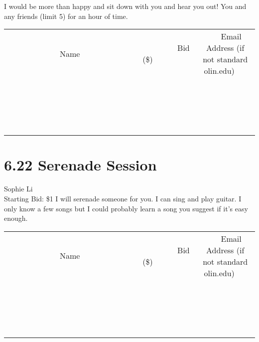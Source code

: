 \documentclass[11pt]{article}
\begin{document}
I would be more than happy and sit down with you and hear you out!  You and any friends (limit 5) for an hour of time.
\\[3ex]
\begin{tabular}{c c c}
~~~~~~~~~~~~~Name~~~~~~~~~~~~~ & ~~~~~~~~~Bid (\$)~~~~~~~~~  & ~~~Email Address (if not standard olin.edu)~~~\\
 & & \\
\hline
 & & \\
\hline
 & & \\
\hline
 & & \\
\hline
 & & \\
\hline
 & & \\
\hline
 & & \\
\hline
 & & \\
\hline
 & & \\
\hline
 & & \\
\hline
 & & \\
\hline
 & & \\
\hline
 & & \\
\hline
 & & \\
\hline
 & & \\
\hline
 & & \\
\hline
 & & \\
\hline
 & & \\
\hline
 & & \\
\hline
\end{tabular}
\newpage
\section*{6.22 Serenade Session}
Sophie Li
\\
Starting Bid: \$1
\newline
I will serenade someone for you. I can sing and play guitar. I only know a few songs but I could probably learn a song you suggest if it's easy enough.
\\[3ex]
\begin{tabular}{c c c}
~~~~~~~~~~~~~Name~~~~~~~~~~~~~ & ~~~~~~~~~Bid (\$)~~~~~~~~~  & ~~~Email Address (if not standard olin.edu)~~~\\
 & & \\
\hline
 & & \\
\hline
 & & \\
\hline
 & & \\
\hline
 & & \\
\hline
 & & \\
\hline
 & & \\
\hline
 & & \\
\hline
 & & \\
\hline
 & & \\
\hline
 & & \\
\hline
 & & \\
\hline
 & & \\
\hline
 & & \\
\hline
 & & \\
\hline
 & & \\
\hline
 & & \\
\hline
 & & \\
\hline
 & & \\
\hline
\end{tabular}
\newpage
\end{document}
